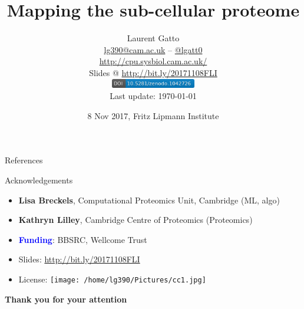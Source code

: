 \documentclass[presentation]{beamer}
\date{8 Nov 2017, Fritz Lipmann Institute}
\title{
  \textbf{Mapping the sub-cellular proteome}
}
\author{Laurent Gatto\\
  \url{lg390@cam.ac.uk} -- \url{@lgatt0}\\
  \url{http://cpu.sysbiol.cam.ac.uk/}\\
  \bigskip
  Slides @ \url{http://bit.ly/20171108FLI}\\
  \includegraphics[height=4mm]{zenodo-1042726.png}\\
  \tiny{Last update: \today}
}
\begin{document}
\maketitle







\begin{frame}[allowframebreaks]{References}
  \tiny
  
  
\end{frame}


\begin{frame}
  \begin{block}{Acknowledgements}
    \begin{itemize}
    \item \textbf{Lisa Breckels}, Computational Proteomics Unit,
      Cambridge (ML, algo)
    \item \textbf{Kathryn Lilley}, Cambridge Centre of Proteomics
      (Proteomics)
    \item \textcolor{Blue}{\textbf{Funding}}: BBSRC, Wellcome Trust
    \end{itemize}
  \end{block}


  {\small
    \begin{itemize}
    \item Slides: \url{http://bit.ly/20171108FLI}
    \item License: \texttt{[image: /home/lg390/Pictures/cc1.jpg]}
    \end{itemize}
  }

  \begin{center}
    \textbf{Thank you for your attention}
  \end{center}

\end{frame}
\end{document}
